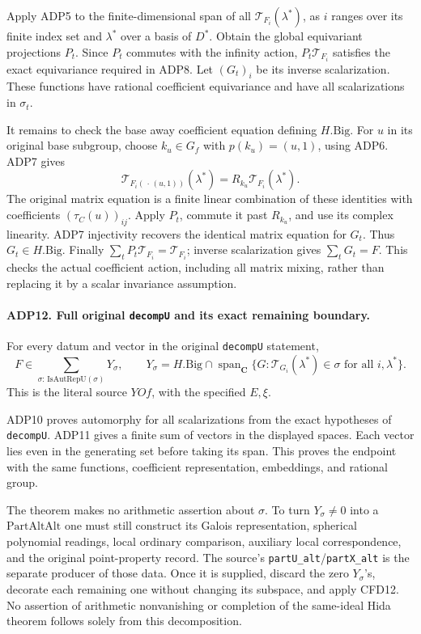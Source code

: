 Apply ADP5 to the finite-dimensional span of all
\(\mathcal T_{F_i}(\lambda^*)\), as \(i\) ranges over its finite
index set and \(\lambda^*\) over a basis of \(D^*\).  Obtain the
global equivariant projections \(P_t\).  Since \(P_t\) commutes with
the infinity action, \(P_t\mathcal T_{F_i}\) satisfies the exact
equivariance required in ADP8.  Let \((G_t)_i\) be its inverse
scalarization.  These functions have rational coefficient equivariance
and have all scalarizations in \(\sigma_t\).

It remains to check the base away coefficient equation defining
\(H.\mathrm{Big}\).  For \(u\) in its original base subgroup, choose
\(k_u\in G_f\) with \(p(k_u)=(u,1)\), using ADP6.  ADP7 gives
\[
 \mathcal T_{F_i(\,\cdot\,(u,1))}(\lambda^*)
      =R_{k_u}\mathcal T_{F_i}(\lambda^*).
\]
The original matrix equation is a finite linear combination of these
identities with coefficients \((\tau_C(u))_{ij}\).  Apply \(P_t\),
commute it past \(R_{k_u}\), and use its complex linearity.  ADP7
injectivity recovers the identical matrix equation for \(G_t\).
Thus \(G_t\in H.\mathrm{Big}\).  Finally
\(\sum_tP_t\mathcal T_{F_i}=\mathcal T_{F_i}\); inverse
scalarization gives \(\sum_tG_t=F\).  This checks the actual
coefficient action, including all matrix mixing, rather than replacing
it by a scalar invariance assumption.

\paragraph{ADP12. Full original \texttt{decompU} and its exact remaining boundary.}
\label{claim:ADP12}
For every datum and vector in the original \texttt{decompU} statement,
\[
 F\in\sum_{\sigma:\,\mathrm{IsAutRepU}(\sigma)}
       Y_{\sigma},\qquad
 Y_{\sigma}=H.\mathrm{Big}\cap
       \operatorname{span}_{\mathbf C}
       \{G:\mathcal T_{G_i}(\lambda^*)\in\sigma
                                   \text{ for all }i,\lambda^*\}.
\]
This is the literal source \(YOf\), with the specified \(E,\xi\).

ADP10 proves automorphy for all scalarizations from the exact hypotheses
of \texttt{decompU}.  ADP11 gives a finite sum of vectors in the
displayed spaces.  Each vector lies even in the generating set before
taking its span.  This proves the endpoint with the same functions,
coefficient representation, embeddings, and rational group.

The theorem makes no arithmetic assertion about \(\sigma\).  To turn
\(Y_\sigma\ne0\) into a \(\mathrm{PartAltAlt}\) one must still
construct its Galois representation, spherical polynomial readings,
local ordinary comparison, auxiliary local correspondence, and the
original point-property record.  The source's
\texttt{partU\_alt}/\texttt{partX\_alt} is the separate producer of
those data.  Once it is supplied, discard the zero \(Y_\sigma\)'s,
decorate each remaining one without changing its subspace, and apply
CFD12.  No assertion of arithmetic nonvanishing or completion of the
same-ideal Hida theorem follows solely from this decomposition.
